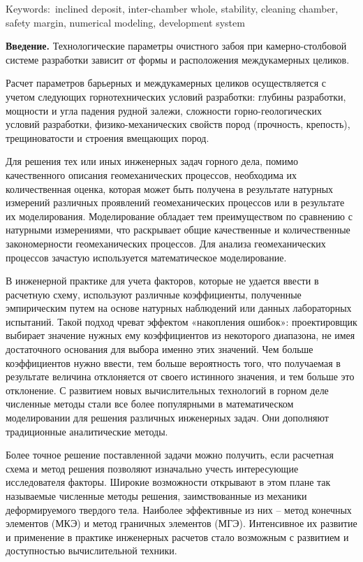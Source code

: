 Keywords:~inclined deposit, inter-chamber whole, stability, cleaning
chamber, safety margin, numerical modeling, development system

{\bfseries Введение.} Технологические параметры очистного забоя при
камерно-столбовой системе разработки зависит от формы и расположения
междукамерных целиков.

Расчет параметров барьерных и междукамерных целиков осуществляется с
учетом следующих горнотехнических условий разработки: глубины
разработки, мощности и угла падения рудной залежи, сложности
горно-геологических условий разработки, физико-механических свойств
пород (прочность, крепость), трещиноватости и строения вмещающих пород.

Для решения тех или иных инженерных задач горного дела, помимо
качественного описания геомеханических процессов, необходима их
количественная оценка, которая может быть получена в результате натурных
измерений различных проявлений геомеханических процессов или в
результате их моделирования. Моделирование обладает тем преимуществом по
сравнению с натурными измерениями, что раскрывает общие качественные и
количественные закономерности геомеханических процессов. Для анализа
геомеханических процессов зачастую используется математическое
моделирование.

В инженерной практике для учета факторов, которые не удается ввести в
расчетную схему, используют различные коэффициенты, полученные
эмпирическим путем на основе натурных наблюдений или данных лабораторных
испытаний. Такой подход чреват эффектом «накопления ошибок»:
проектировщик выбирает значение нужных ему коэффициентов из некоторого
диапазона, не имея достаточного основания для выбора именно этих
значений. Чем больше коэффициентов нужно ввести, тем больше вероятность
того, что получаемая в результате величина отклоняется от своего
истинного значения, и тем больше это отклонение. С развитием новых
вычислительных технологий в горном деле численные методы стали все более
популярными в математическом моделировании для решения различных
инженерных задач. Они дополняют традиционные аналитические методы.

Более точное решение поставленной задачи можно получить, если расчетная
схема и метод решения позволяют изначально учесть интересующие
исследователя факторы. Широкие возможности открывают в этом плане так
называемые численные методы решения, заимствованные из механики
деформируемого твердого тела. Наиболее эффективные из них -- метод
конечных элементов (МКЭ) и метод граничных элементов (МГЭ). Интенсивное
их развитие и применение в практике инженерных расчетов стало возможным
с развитием и доступностью вычислительной техники.

